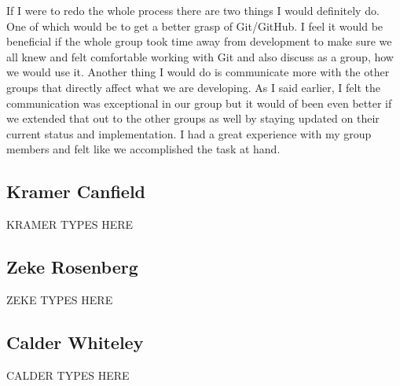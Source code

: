 \documentclass[12pt]{article}
\begin{document}
\begin{changemargin}{1cm}{0cm}
           If I were to redo the whole process there are two things I would definitely do. One of which would be to get a better grasp of Git/GitHub. I feel it would be beneficial if the whole group took time away from development to make sure we all knew and felt comfortable working with Git and also discuss as a group, how we would use it. Another thing I would do is communicate more with the other groups that directly affect what we are developing. As I said earlier, I felt the communication was exceptional in our group but it would of been even better if we extended that out to the other groups as well by staying updated on their current status and implementation. I had a great experience with my group members and felt like we accomplished the task at hand. 
\end{changemargin} 
\subsection{Kramer Canfield}
\begin{changemargin}{1cm}{0cm} 
KRAMER TYPES HERE
\end{changemargin} 
\subsection{Zeke Rosenberg}
\begin{changemargin}{1cm}{0cm} 
ZEKE TYPES HERE
\end{changemargin} 
\subsection{Calder Whiteley}
\begin{changemargin}{1cm}{0cm} 
CALDER TYPES HERE
\end{changemargin} 
\end{document}
